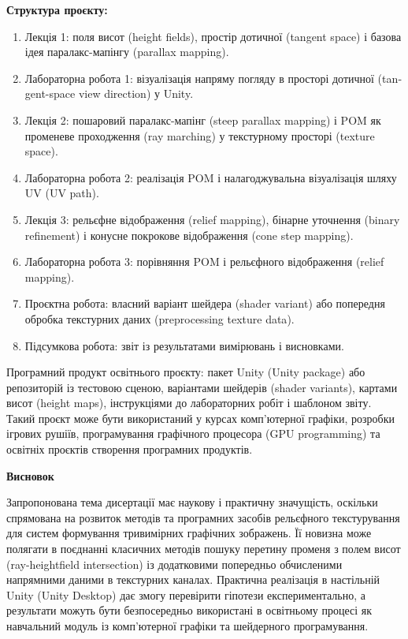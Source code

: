 \documentclass[14pt,a4paper]{extarticle}
\newcommand{\eng}[1]{\foreignlanguage{english}{#1}}
\newcommand{\sectiontitle}[1]{%
  \par\vspace{\baselineskip}%
  \noindent\textbf{#1}\par
}
\begin{document}
\noindent\textbf{Структура проєкту:}
\begin{enumerate}
  \item Лекція 1: поля висот (\eng{height fields}), простір дотичної (\eng{tangent space}) і базова ідея паралакс-мапінгу (\eng{parallax mapping}).
  \item Лабораторна робота 1: візуалізація напряму погляду в просторі дотичної (\eng{tangent-space view direction}) у Unity.
  \item Лекція 2: пошаровий паралакс-мапінг (\eng{steep parallax mapping}) і POM як променеве проходження (\eng{ray marching}) у текстурному просторі (\eng{texture space}).
  \item Лабораторна робота 2: реалізація POM і налагоджувальна візуалізація шляху UV (\eng{UV path}).
  \item Лекція 3: рельєфне відображення (\eng{relief mapping}), бінарне уточнення (\eng{binary refinement}) і конусне покрокове відображення (\eng{cone step mapping}).
  \item Лабораторна робота 3: порівняння POM і рельєфного відображення (\eng{relief mapping}).
  \item Проєктна робота: власний варіант шейдера (\eng{shader variant}) або попередня обробка текстурних даних (\eng{preprocessing texture data}).
  \item Підсумкова робота: звіт із результатами вимірювань і висновками.
\end{enumerate}

Програмний продукт освітнього проєкту: пакет Unity (\eng{Unity package}) або репозиторій із тестовою сценою, варіантами шейдерів (\eng{shader variants}), картами висот (\eng{height maps}), інструкціями до лабораторних робіт і шаблоном звіту. Такий проєкт може бути використаний у курсах комп'ютерної графіки, розробки ігрових рушіїв, програмування графічного процесора (\eng{GPU programming}) та освітніх проєктів створення програмних продуктів.

\sectiontitle{Висновок}

Запропонована тема дисертації має наукову і практичну значущість, оскільки спрямована на розвиток методів та програмних засобів рельєфного текстурування для систем формування тривимірних графічних зображень. Її новизна може полягати в поєднанні класичних методів пошуку перетину променя з полем висот (\eng{ray-heightfield intersection}) із додатковими попередньо обчисленими напрямними даними в текстурних каналах. Практична реалізація в настільній Unity (\eng{Unity Desktop}) дає змогу перевірити гіпотези експериментально, а результати можуть бути безпосередньо використані в освітньому процесі як навчальний модуль із комп'ютерної графіки та шейдерного програмування.
\end{document}
